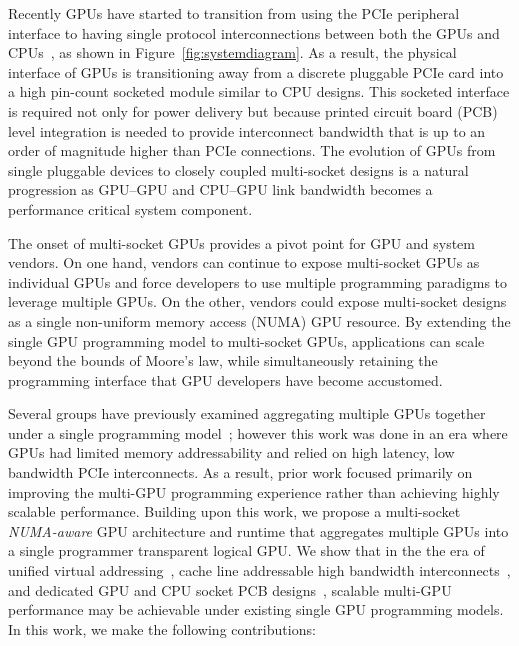Recently GPUs have started to transition from using the PCIe peripheral 
interface to having single protocol interconnections between both the GPUs and 
CPUs~\cite{dgx,SierraHPC,AMDINFINITYFABRIC}, as shown in 
Figure~\ref{fig:systemdiagram}. As a result, the physical interface of GPUs is 
transitioning away from a discrete pluggable PCIe card into a high pin-count 
socketed module similar to CPU designs. This socketed interface is required 
not only for power delivery but because
printed circuit board (PCB) level integration is needed to provide
interconnect bandwidth that is up to an order of magnitude higher than PCIe
connections. The evolution of GPUs from single pluggable devices to closely
coupled multi-socket designs is a natural progression as GPU--GPU and CPU--GPU
link bandwidth becomes a performance critical system component.

The onset of multi-socket GPUs provides a pivot point for GPU and system 
vendors. On one hand, vendors can continue to expose multi-socket GPUs as 
individual GPUs and force developers to use multiple programming paradigms to 
leverage multiple GPUs. On the other, vendors could expose multi-socket 
designs as a single non-uniform memory access (NUMA) GPU resource.  By 
extending the single GPU programming model to multi-socket GPUs,  applications 
can scale beyond the bounds of Moore's law, while simultaneously retaining the 
programming interface that GPU developers have become accustomed.

Several groups have previously examined aggregating multiple GPUs together under 
a single programming model~\cite{lee2013transparent,Cabezas2015}; however this 
work was done in an era where GPUs had limited memory addressability and relied 
on high latency, low bandwidth PCIe interconnects. As a result, prior work 
focused primarily on improving the multi-GPU programming experience rather than 
achieving highly scalable performance. Building upon this work, we propose a 
multi-socket \textit{NUMA-aware} GPU architecture and runtime that aggregates 
multiple GPUs into a single programmer transparent logical GPU. We show that in 
the the era of unified virtual addressing~\cite{UVM}, cache line addressable 
high bandwidth interconnects~\cite{NVLINK}, and dedicated GPU and CPU socket PCB 
designs~\cite{SierraHPC}, scalable multi-GPU performance may be achievable under 
existing single GPU programming models. In this work, we make the following 
contributions:

